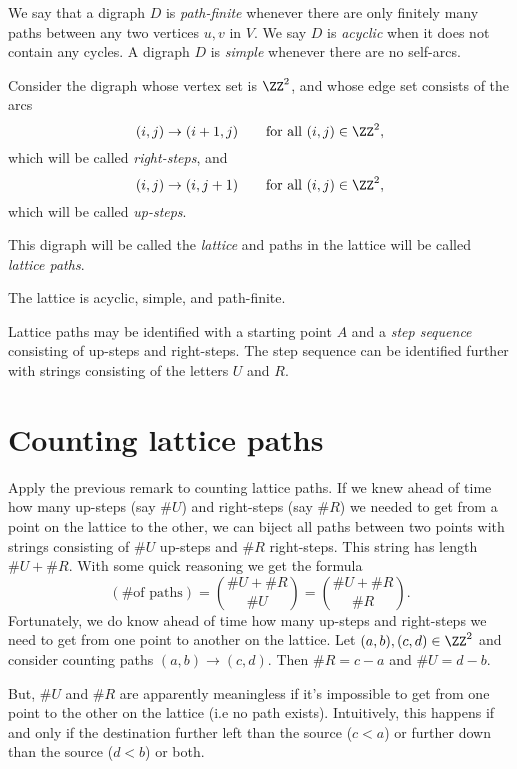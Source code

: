 \documentclass{article}
\begin{document}
We say that a digraph $D$ is \textit{path-finite} whenever there are only finitely many paths between any two vertices $u, v$ in $V$. We say $D$ is \textit{acyclic} when it does not contain any cycles. A digraph $D$ is \textit{simple} whenever there are no self-arcs.

\begin{definition}
    Consider the digraph whose vertex set is $\ZZ^2$, and whose edge set consists of the arcs
    \[
        (i,j) \rightarrow (i+1, j) \qquad \text{for all } (i,j) \in \ZZ^2,
    \]
    which will be called \textit{right-steps}, and
    \[
        (i,j) \rightarrow (i, j+1) \qquad \text{for all } (i,j) \in \ZZ^2,
    \]
    which will be called \textit{up-steps}.

    This digraph will be called the \textit{lattice} and paths in the lattice will be called \textit{lattice paths}.
\end{definition}

The lattice is acyclic, simple, and path-finite.

\begin{remark}
    Lattice paths may be identified with a starting point $A$ and a \textit{step sequence} consisting of up-steps and right-steps. The step sequence can be identified further with strings consisting of the letters $U$ and $R$.
\end{remark}


\section{Counting lattice paths}

Apply the previous remark to counting lattice paths. If we knew ahead of time how many up-steps (say $\#U$) and right-steps (say $\#R$) we needed to get from a point on the lattice to the other, we can biject all paths between two points with strings consisting of $\#U$ up-steps and $\#R$ right-steps.
This string has length $\#U + \#R$. With some quick reasoning we get the formula
\[
    (\text{\# of paths}) = \binom{\#U + \#R}{\#U} = \binom{\#U + \#R}{\#R}.
\]
Fortunately, we do know ahead of time how many up-steps and right-steps we need to get from one point to another on the lattice. 
Let $(a,b), (c,d) \in \ZZ^2$ and consider counting paths $(a,b) \rightarrow (c,d)$. Then $\#R = c-a$ and $\#U = d-b$.

But, $\#U$ and $\#R$ are apparently meaningless if it's impossible to get from one point to the other on the lattice (i.e no path exists). 
Intuitively, this happens if and only if the destination further left than the source ($c<a$) or further down than the source ($d<b$) or both. 
\end{document}
